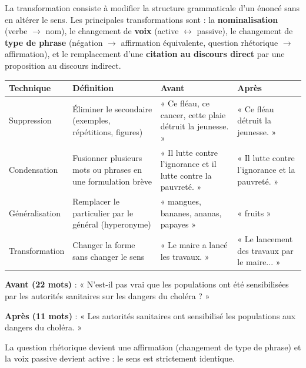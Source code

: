 \documentclass[11pt]{article}
\newcommand{\cle}[1]{{\popxbold\color{popdark}#1}}
\begin{document}
\begin{definition}[La transformation]
La \cle{transformation} consiste à modifier la structure grammaticale d'un énoncé sans en altérer le sens. Les principales transformations sont : la \textbf{nominalisation} (verbe $\rightarrow$ nom), le changement de \textbf{voix} (active $\leftrightarrow$ passive), le changement de \textbf{type de phrase} (négation $\rightarrow$ affirmation équivalente, question rhétorique $\rightarrow$ affirmation), et le remplacement d'une \textbf{citation au discours direct} par une proposition au discours indirect.
\end{definition}

\begin{center}
\begin{tabularx}{\linewidth}{|l|X|X|X|}
\hline
\rowcolor{popblueL} \textbf{Technique} & \textbf{Définition} & \textbf{Avant} & \textbf{Après} \\
\hline
Suppression & Éliminer le secondaire (exemples, répétitions, figures) & « Ce fléau, ce cancer, cette plaie détruit la jeunesse. » & « Ce fléau détruit la jeunesse. » \\
\hline
Condensation & Fusionner plusieurs mots ou phrases en une formulation brève & « Il lutte contre l'ignorance et il lutte contre la pauvreté. » & « Il lutte contre l'ignorance et la pauvreté. » \\
\hline
Généralisation & Remplacer le particulier par le général (hyperonyme) & « mangues, bananes, ananas, papayes » & « fruits » \\
\hline
Transformation & Changer la forme sans changer le sens & « Le maire a lancé les travaux. » & « Le lancement des travaux par le maire... » \\
\hline
\end{tabularx}
\end{center}

\begin{exemplebox}
\textbf{Avant (22 mots)} : « N'est-il pas vrai que les populations ont été sensibilisées par les autorités sanitaires sur les dangers du choléra ? »

\textbf{Après (11 mots)} : « Les autorités sanitaires ont sensibilisé les populations aux dangers du choléra. »

La question rhétorique devient une affirmation (changement de type de phrase) et la voix passive devient active : le sens est strictement identique.
\end{exemplebox}
\end{document}
